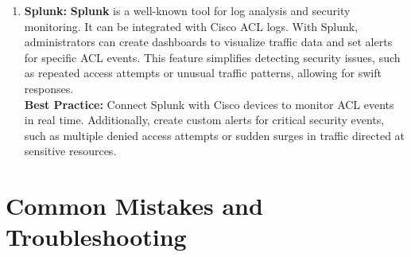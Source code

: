 \documentclass[11pt,a4paper]{article}
\begin{document}
\begin{enumerate}
            \item \textbf{Splunk:} \textbf{Splunk} is a well-known tool for log analysis and security monitoring. It can be integrated with Cisco ACL logs. With Splunk, administrators can create dashboards to visualize traffic data and set alerts for specific ACL events. This feature simplifies detecting security issues, such as repeated access attempts or unusual traffic patterns, allowing for swift responses.
            \\[1em]
            \textbf{Best Practice:} Connect Splunk with Cisco devices to monitor ACL events in real time. Additionally, create custom alerts for critical security events, such as multiple denied access attempts or sudden surges in traffic directed at sensitive resources.

        \end{enumerate}

\section*{Common Mistakes and Troubleshooting}
\end{document}

